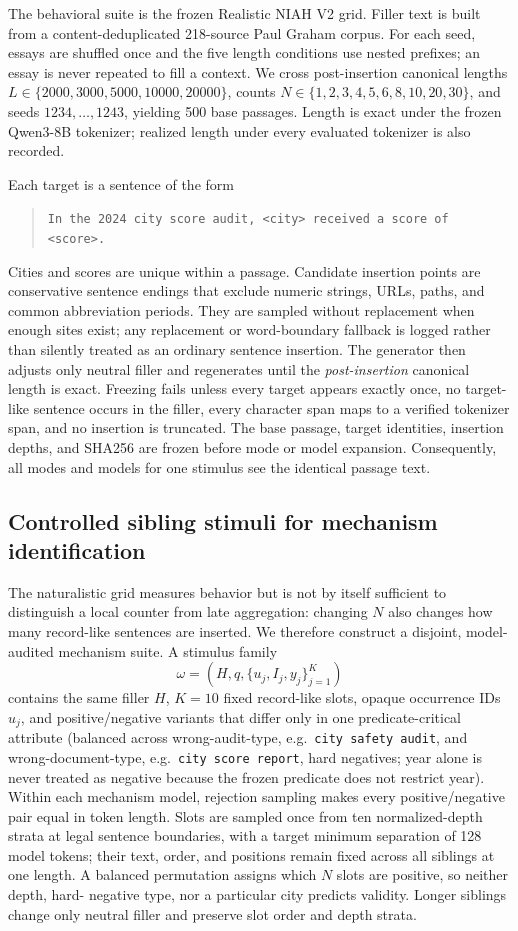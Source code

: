 \documentclass[10pt,twocolumn]{article}
\begin{document}
The behavioral suite is the frozen Realistic NIAH V2 grid. Filler text is built from a
content-deduplicated 218-source Paul Graham corpus. For each seed, essays are shuffled once and
the five length conditions use nested prefixes; an essay is never repeated to fill a context.
We cross post-insertion canonical lengths
$L\in\{2000,3000,5000,10000,20000\}$, counts
$N\in\{1,2,3,4,5,6,8,10,20,30\}$, and seeds $1234,\ldots,1243$, yielding 500 base passages.
Length is exact under the frozen Qwen3-8B tokenizer; realized length under every evaluated
tokenizer is also recorded.

Each target is a sentence of the form
\begin{quote}\small
\texttt{In the 2024 city score audit, <city> received a score of <score>.}
\end{quote}
Cities and scores are unique within a passage. Candidate insertion points are conservative
sentence endings that exclude numeric strings, URLs, paths, and common abbreviation periods.
They are sampled without replacement when enough sites exist; any replacement or word-boundary
fallback is logged rather than silently treated as an ordinary sentence insertion. The
generator then adjusts only neutral filler and regenerates until the \emph{post-insertion}
canonical length is exact. Freezing fails unless every target appears exactly once, no
target-like sentence occurs in the filler, every character span maps to a verified tokenizer
span, and no insertion is truncated. The base passage, target identities, insertion depths, and
SHA256 are frozen before mode or model expansion. Consequently, all modes and models for one
stimulus see the identical passage text.

\subsection{Controlled sibling stimuli for mechanism identification}
The naturalistic grid measures behavior but is not by itself sufficient to distinguish a local
counter from late aggregation: changing $N$ also changes how many record-like sentences are
inserted. We therefore construct a disjoint, model-audited mechanism suite. A stimulus family
\[
 \omega=(H,q,\{u_j,I_j,y_j\}_{j=1}^{K})
\]
contains the same filler $H$, $K=10$ fixed record-like slots, opaque occurrence IDs $u_j$, and
positive/negative variants that differ only in one predicate-critical attribute (balanced
across wrong-audit-type, e.g.\ \texttt{city safety audit}, and wrong-document-type, e.g.\
\texttt{city score report}, hard negatives; year alone is never treated as negative because the
frozen predicate does not restrict year). Within each mechanism model, rejection
sampling makes every positive/negative pair equal in token length. Slots are sampled once from
ten normalized-depth strata at legal sentence boundaries, with a target minimum separation of
128 model tokens; their text, order, and positions remain fixed across all siblings at one
length. A balanced permutation assigns which $N$ slots are positive, so neither depth, hard-
negative type, nor a particular city predicts validity. Longer siblings change only neutral
filler and preserve slot order and depth strata.
\end{document}
